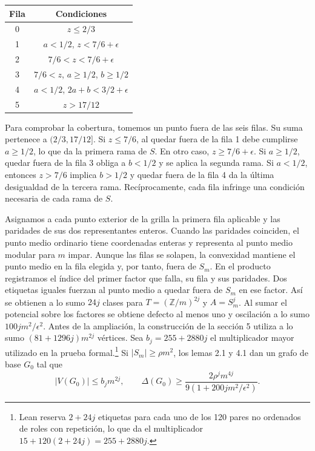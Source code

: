 \documentclass[spanish,11pt,a4paper]{article}
\begin{document}
\begin{center}
\begin{tabular}{cc}
\toprule
Fila & Condiciones \\
\midrule
0 & $z\le 2/3$ \\
1 & $a<1/2$, $z<7/6+\epsilon$ \\
2 & $7/6<z<7/6+\epsilon$ \\
3 & $7/6<z$, $a\ge1/2$, $b\ge1/2$ \\
4 & $a<1/2$, $2a+b<3/2+\epsilon$ \\
5 & $z>17/12$ \\
\bottomrule
\end{tabular}
\end{center}

Para comprobar la cobertura, tomemos un punto fuera de las seis filas. Su suma pertenece a \((2/3,17/12]\). Si \(z\le7/6\), al quedar fuera de la fila 1 debe cumplirse \(a\ge1/2\), lo que da la primera rama de \(S\). En otro caso, \(z\ge7/6+\epsilon\). Si \(a\ge1/2\), quedar fuera de la fila 3 obliga a \(b<1/2\) y se aplica la segunda rama. Si \(a<1/2\), entonces \(z>7/6\) implica \(b>1/2\) y quedar fuera de la fila 4 da la última desigualdad de la tercera rama. Recíprocamente, cada fila infringe una condición necesaria de cada rama de \(S\).

Asignamos a cada punto exterior de la grilla la primera fila aplicable y las paridades de sus dos representantes enteros. Cuando las paridades coinciden, el punto medio ordinario tiene coordenadas enteras y representa al punto medio modular para \(m\) impar. Aunque las filas se solapen, la convexidad mantiene el punto medio en la fila elegida y, por tanto, fuera de \(S_m\). En el producto registramos el índice del primer factor que falla, su fila y sus paridades. Dos etiquetas iguales fuerzan al punto medio a quedar fuera de \(S_m\) en ese factor. Así se obtienen a lo sumo \(24j\) clases para \(T=(\mathbb Z/m)^{2j}\) y \(A=S_m^j\). Al sumar el potencial sobre los factores se obtiene defecto al menos uno y oscilación a lo sumo \(100jm^2/\epsilon^2\). Antes de la ampliación, la construcción de la sección 5 utiliza a lo sumo \((81+1296j)m^{2j}\) vértices. Sea \(b_j=255+2880j\) el multiplicador mayor utilizado en la prueba formal.\footnote{Lean reserva \(2+24j\) etiquetas para cada uno de los 120 pares no ordenados de roles con repetición, lo que da el multiplicador \(15+120(2+24j)=255+2880j\).} Si \(|S_m|\ge\rho m^2\), los lemas 2.1 y 4.1 dan un grafo de base \(G_0\) tal que
\[|V(G_0)|\le b_j m^{2j},\qquad
 \Delta(G_0)\ge\frac{2\rho^j m^{4j}}{9(1+200jm^2/\epsilon^2)}.\]
\end{document}
